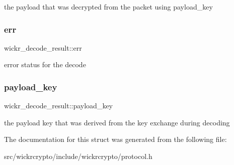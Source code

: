 the payload that was decrypted from the packet using payload\+\_\+key \mbox{\label{structwickr__decode__result_a63449a59c8a8bab451f5ab555be7895d}} 
\subsubsection{\texorpdfstring{err}{err}}
{\footnotesize\ttfamily wickr\+\_\+decode\+\_\+result\+::err}

error status for the decode \mbox{\label{structwickr__decode__result_aed31d598b49bf696f286d673246d8b31}} 
\subsubsection{\texorpdfstring{payload\+\_\+key}{payload\_key}}
{\footnotesize\ttfamily wickr\+\_\+decode\+\_\+result\+::payload\+\_\+key}

the payload key that was derived from the key exchange during decoding 

The documentation for this struct was generated from the following file\+:\begin{DoxyCompactItemize}
\item 
src/wickrcrypto/include/wickrcrypto/protocol.\+h\end{DoxyCompactItemize}
